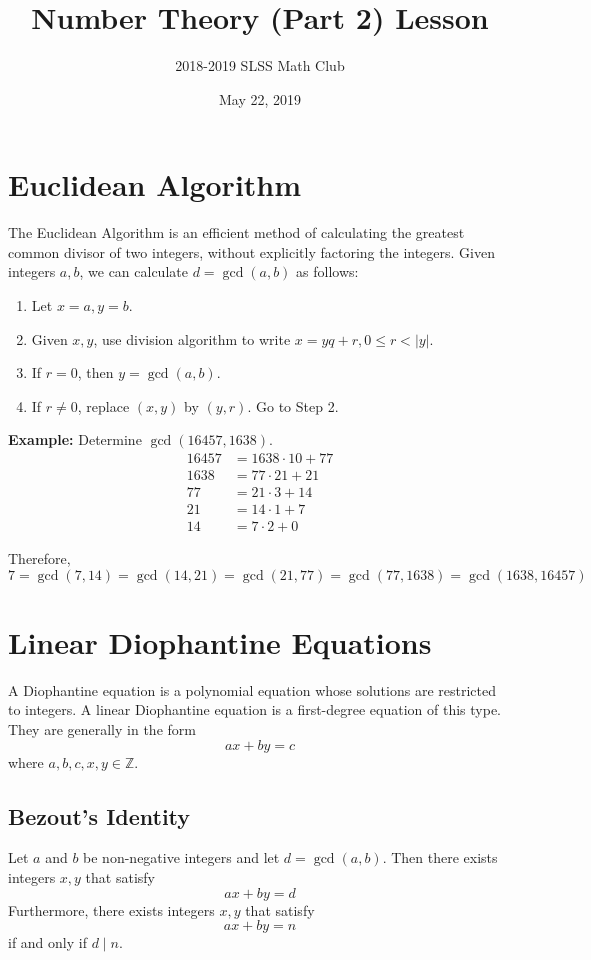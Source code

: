 \documentclass[12pt]{article}
\title{Number Theory (Part 2) Lesson\vspace{-3mm}}
\author{2018-2019 SLSS Math Club\vspace{-5mm}}
\date{May 22, 2019\vspace{-5mm}}
\newcommand{\tdiv}{\; | \;}
\begin{document}
\maketitle

\section{Euclidean Algorithm}
The Euclidean Algorithm is an efficient method of calculating the greatest common divisor of two integers, without explicitly factoring the integers. Given integers $a, b$, we can calculate $d = \gcd{(a, b)}$ as follows:
\begin{enumerate}
    \item Let $x = a, y = b$.
    \item Given $x, y$, use division algorithm to write $x = yq + r, 0 \leq r < |y|$.
    \item If $r = 0$, then $y = \gcd{(a, b)}$.
    \item If $r \neq 0$, replace $(x, y)$ by $(y, r)$. Go to Step 2.
\end{enumerate}

\textbf{Example:} Determine $\gcd{(16457, 1638)}$.
\begin{align*}
    16457 &= 1638 \cdot 10 + 77 \\
    1638 &= 77 \cdot 21 + 21 \\
    77 &= 21 \cdot 3 + 14 \\
    21 &= 14 \cdot 1 + 7 \\
    14 &= 7 \cdot 2 + 0
\end{align*}

Therefore, $7 = \gcd{(7, 14)} = \gcd{(14, 21)} = \gcd{(21, 77)} = \gcd{(77, 1638)} = \gcd{(1638, 16457)}$

\section{Linear Diophantine Equations}
A Diophantine equation is a polynomial equation whose solutions are restricted to integers. A linear Diophantine equation is a first-degree equation of this type. They are generally in the form $$ax + by = c$$ where $a, b, c, x, y \in \mathbb{Z}$.

\subsection{Bezout's Identity}
Let $a$ and $b$ be non-negative integers and let $d = \gcd{(a, b)}$. Then there exists integers $x, y$ that satisfy $$ax + by = d$$ Furthermore, there exists integers $x, y$ that satisfy $$ax + by = n$$ if and only if $d \tdiv n$.
\end{document}
